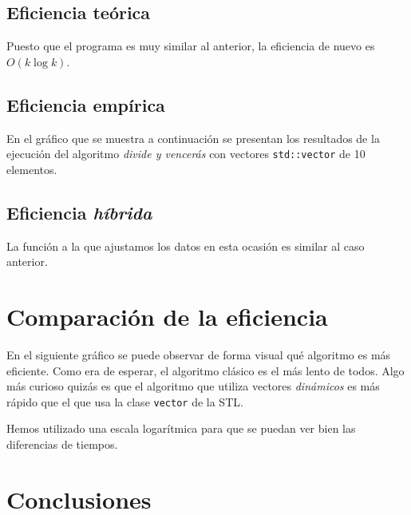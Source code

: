 \documentclass[11pt]{article}
\begin{document}


\subsection*{Eficiencia teórica}

Puesto que el programa es muy similar al anterior, la eficiencia de nuevo es $O(k\log k)$.

\subsection*{Eficiencia empírica}

En el gráfico que se muestra a continuación se presentan los resultados de la
ejecución del algoritmo \textit{divide y vencerás} con vectores
\texttt{std::vector} de 10 elementos.

\begin{center}
	
\end{center}

\subsection*{Eficiencia \textit{híbrida}}
La función a la que ajustamos los datos en esta ocasión es similar al caso anterior.

\begin{center}
	
\end{center}

\section*{Comparación de la eficiencia}

En el siguiente gráfico se puede observar de forma visual qué algoritmo es más
eficiente. Como era de esperar, el algoritmo clásico es el más lento de
todos. Algo más curioso quizás es que el algoritmo que utiliza vectores
\textit{dinámicos} es más rápido que el que usa la clase \texttt{vector} de la STL.

\begin{center}
	
\end{center}

Hemos utilizado una escala logarítmica para que se puedan ver bien las diferencias de tiempos.

\section*{Conclusiones}
\end{document}
